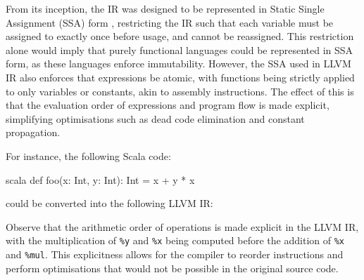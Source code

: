From its inception, the IR was designed to be represented in Static Single Assignment (SSA) form
\autocite{lattner2004llvm}, restricting the IR such that each variable must be assigned to exactly
once before usage, and cannot be reassigned. This restriction alone would imply that purely
functional languages could be represented in SSA form, as these languages enforce immutability.
However, the SSA used in LLVM IR also enforces that expressions be atomic, with functions being
strictly applied to only variables or constants, akin to assembly instructions. The effect of this
is that the evaluation order of expressions and program flow is made explicit, simplifying
optimisations such as dead code elimination and constant propagation.

For instance, the following Scala code:

\begin{code}{scala}
    def foo(x: Int, y: Int): Int = x + y * x
\end{code}

could be converted into the following LLVM IR:


Observe that the arithmetic order of operations is made explicit in the LLVM IR, with the
multiplication of \texttt{\%y} and \texttt{\%x} being computed before the addition of \texttt{\%x}
and \texttt{\%mul}. This explicitness allows for the compiler to reorder instructions and perform
optimisations that would not be possible in the original source code.


